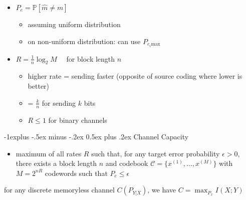 \documentclass[10pt, landscape]{article}
\makeatletter
\renewcommand{\subsection}{\@startsection{subsection}{2}{0mm}%
  {-1explus -.5ex minus -.2ex}%
  {0.5ex plus .2ex}%
{\normalfont\normalsize\bfseries}}
\makeatother
\begin{document}
\begin{multicols*}{4}
  \begin{itemize}
    \item {} $P_e = \mathbb{P}[\hat{m} \neq m]$
      \begin{itemize}
        \item assuming uniform distribution
        \item on non-uniform distribution: can use  $P_{e_i \text{max}}$
      \end{itemize}
    \item {} $R = \frac{1}{n} \log_2 M \quad$ for block length $n$
      \begin{itemize}
        \item higher rate = sending faster (opposite of source coding where lower is better)
        \item = $\frac{k}{n}$ for sending $k$ bits
        \item $R \leq 1$ for binary channels
      \end{itemize}
  \end{itemize}

  \subsection{Channel Capacity}

  \begin{itemize}
    \item {} maximum of all rates $R$ such that, for any target error probability $\epsilon > 0$, there exists a block length $n$ and codebook $\mathcal{C} = \{x^{(1)}, \dots, x^{(M)}\}$ with $M=2^{nR}$ codewords such that $P_e \leq \epsilon$
  \end{itemize}

  \begin{tightcenter}

    for any discrete memoryless channel $C(P_{Y \vert X})$,
    we have \( {\displaystyle{ C=\max_{P_x} I(X;Y) }} \) 
  \end{tightcenter}


\end{multicols*}
\end{document}
